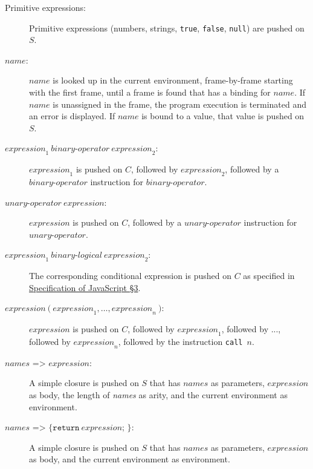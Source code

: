 \begin{description}
\item[Primitive expressions:]
Primitive expressions (numbers, strings, \lstinline{true}, \lstinline{false},
\lstinline{null}) are pushed on $S$.

\item[$\textit{name}$:]
$\textit{name}$ is looked up in the current environment, frame-by-frame starting with
the first frame, until a frame is found that has a binding for 
$\textit{name}$. If
$\textit{name}$ is unassigned in the frame, the program execution is terminated
and an error is displayed. If
$\textit{name}$ is bound to a value, that value is pushed on $S$.

\item[$\textit{expression}_1\ \textit{binary-operator}\ \textit{expression}_2$:]
$\textit{expression}_1$ is pushed on $C$, followed by
$\textit{expression}_2$, followed by a
$\textit{binary-operator}$ instruction for
$\textit{binary-operator}$.

\item[$\textit{unary-operator}\ \textit{expression}$:]
$\textit{expression}$ is pushed on $C$, followed by a
$\textit{unary-operator}$ instruction for
$\textit{unary-operator}$.

\item[$\textit{expression}_1\ \textit{binary-logical}\ \textit{expression}_2$:]
The corresponding conditional expression 
is pushed on $C$ as specified in
\href{https://docs.sourceacademy.org/javascript/javascript_3.pdf}{\color{blue}Specification of JavaScript \S 3}.

\item[$\textit{expression}\ \texttt{(}\ \textit{expression}_1,\ldots,\textit{expression}_n\
\texttt{)}$:]
$\textit{expression}$ is pushed on $C$, followed by
$\textit{expression}_1$, followed by ..., followed by
$\textit{expression}_n$, followed by
the instruction \texttt{call}\ $n$.

\item[$\textit{names} \texttt{ => } \textit{expression}$:]
A simple closure is pushed on $S$ that has
$\textit{names}$ as parameters, 
$\textit{expression}$ as body,
the length of \textit{names} as arity,
and the current environment as environment.

\item[$\textit{names} \texttt{ => \{ return}\ \textit{expression}\texttt{; \}}$:]
A simple closure is pushed on $S$ that has
$\textit{names}$ as parameters, 
$\textit{expression}$ as body, and the current environment as environment.


\end{description}
